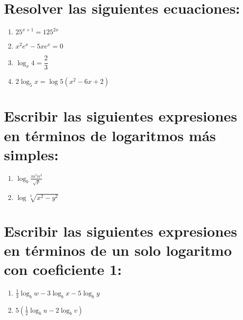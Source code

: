 \documentclass{article}
\begin{document}
\section*{Resolver las siguientes ecuaciones:}

\begin{enumerate}
    \item $25^{x+1} = 125^{2x}$
    \item $x^2e^x - 5xe^x=0$
    \item $ \log_x4 = \dfrac{2}{3}$
    \item $2\log_5x = \log5 (x^2 - 6x + 2) $
\end{enumerate}

\section*{Escribir las siguientes expresiones en términos de logaritmos más simples:}

\begin{enumerate}
    \item $\log_b\frac{m^5n^3}{\sqrt{p}}$
    \item $\log\sqrt[3]{x^2-y^2}$
\end{enumerate}

\section*{Escribir las siguientes expresiones en términos de un solo logaritmo con coeficiente 1:}

\begin{enumerate}
    \item $\frac{1}{3} \log_bw - 3 \log_b x - 5 \log_by$
    \item $5(\frac{1}{2}\log_bu - 2\log_bv)$
\end{enumerate}
\end{document}
